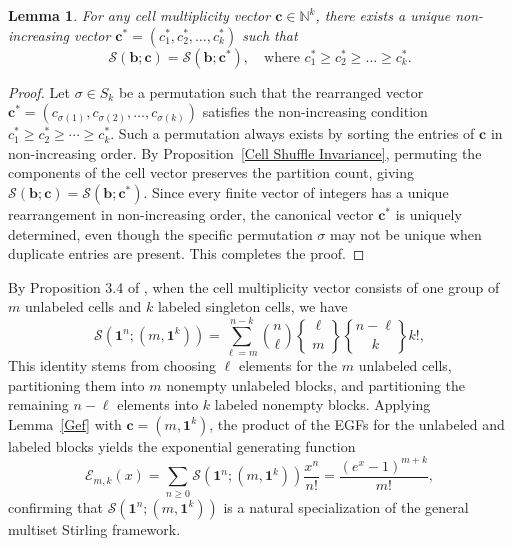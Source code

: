 \documentclass[12pt]{amsart}
\newtheorem{lemma}[theorem]{Lemma}
\theoremstyle{definition}
\begin{document}
\begin{lemma}\label{Canonical Form}
For any cell multiplicity vector $\mathbf{c} \in \mathbb{N}^k$, there exists a unique non-increasing vector $\mathbf{c}^* = (c^*_1, c^*_2, \dots, c^*_k)$ such that
\begin{equation*}
    \mathcal{S}(\mathbf{b}; \mathbf{c}) = \mathcal{S}(\mathbf{b}; \mathbf{c}^*), \quad \text{where } c^*_1 \ge c^*_2 \ge \dots \ge c^*_k.
\end{equation*}
\end{lemma}
\begin{proof}
Let $\sigma \in S_k$ be a permutation such that the rearranged vector $\mathbf{c}^* = (c_{\sigma(1)}, c_{\sigma(2)}, \ldots, c_{\sigma(k)})$ satisfies the non-increasing condition $c_1^* \ge c_2^* \ge \cdots \ge c_k^*$. Such a permutation always exists by sorting the entries of $\mathbf{c}$ in non-increasing order. 
By Proposition~\ref{Cell Shuffle Invariance}, permuting the components of the cell vector preserves the partition count, giving $\mathcal{S}(\mathbf{b}; \mathbf{c}) = \mathcal{S}(\mathbf{b}; \mathbf{c}^*)$.
Since every finite vector of integers has a unique rearrangement in non-increasing order, the canonical vector $\mathbf{c}^*$ is uniquely determined, even though the specific permutation $\sigma$ may not be unique when duplicate entries are present. This completes the proof.
\end{proof}
By Proposition 3.4 of \cite{Yaqubi2016}, when the cell multiplicity vector consists of one group of $m$ unlabeled cells and $k$ labeled singleton cells, we have
\begin{equation*}\label{Con}
    \mathcal{S}(\mathbf{1}^n;(m,\mathbf{1}^{k})) = \sum_{\ell=m}^{n-k} \binom{n}{\ell} {\ell \brace m} {n-\ell \brace k} k!,
\end{equation*}
This identity stems from choosing $\ell$ elements for the $m$ unlabeled cells, partitioning them into $m$ nonempty unlabeled blocks, and partitioning the remaining $n-\ell$ elements into $k$ labeled nonempty blocks.
Applying Lemma~\ref{Gef} with $\mathbf{c} = (m, \mathbf{1}^k)$, the product of the EGFs for the unlabeled and labeled blocks yields the exponential generating function
\begin{equation*}
    \mathcal{E}_{m,k}(x) = \sum_{n\ge0} \mathcal{S}(\mathbf{1}^n;(m,\mathbf{1}^{k})) \frac{x^n}{n!} = \frac{(e^x-1)^{m+k}}{m!},
\end{equation*}
confirming that $\mathcal{S}(\mathbf{1}^n;(m,\mathbf{1}^k))$ is a natural specialization of the general multiset Stirling framework.
\end{document}
